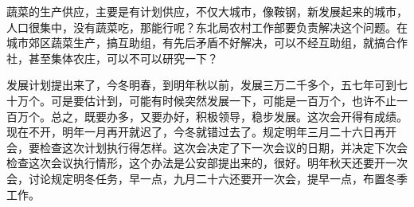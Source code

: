 蔬菜的生产供应，主要是有计划供应，不仅大城市，像鞍钢，新发展起来的城市，人口很集中，没有蔬菜吃，那能行呢？东北局农村工作部要负责解决这个问题。在城市郊区蔬菜生产，搞互助组，有先后矛盾不好解决，可以不经互助组，就搞合作社，甚至集体农庄，可以不可以研究一下？

发展计划提出来了，今冬明春，到明年秋以前，发展三万二千多个，五七年可到七十万个。可是要估计到，可能有时候突然发展一下，可能是一百万个，也许不止一百万个。总之，既要办多，又要办好，积极领导，稳步发展。这次会开得有成绩。现在不开，明年一月再开就迟了，今冬就错过去了。规定明年三月二十六日再开会，要检查这次计划执行得怎样。这次会决定了下一次会议的日期，并决定下次会检查这次会议执行情形，这个办法是公安部提出来的，很好。明年秋天还要开一次会，讨论规定明冬任务，早一点，九月二十六还要开一次会，提早一点，布置冬季工作。


